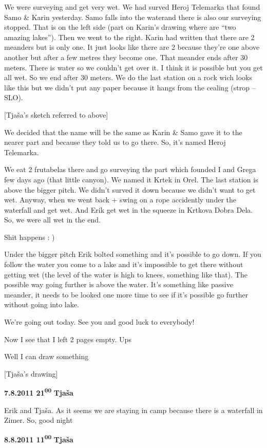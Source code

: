 We were surveying and get very wet. We had surved Heroj Telemarka that
found Samo \& Karin yesterday. Samo falls into the waterand there is
also our surveying stopped. That is on the left side (part on Karin's
drawing where are ``two amazing lakes''). Then we went to the right.
Karin had written that there are 2 meanders but is only one. It just
looks like there are 2 because they're one above another but after a few
metres they become one. That meander ends after 30 meters. There is
water so we couldn't get over it. I think it is possible but you get all
wet. So we end after 30 meters. We do the last station on a rock wich
looks like this but we didn't put any paper because it hangs from the
cealing (strop -- SLO).

{[}Tjaša's sketch referred to above{]}

We decided that the name will be the same as Karin \& Samo gave it to
the nearer part and because they told us to go there. So, it's named
Heroj Telemarka.

We eat 2 frutabelas there and go surveying the part which founded I and
Grega few days ago (that little canyon). We named it Krtek in Orel. The
last station is above the bigger pitch. We didn't surved it down because
we didn't want to get wet. Anyway, when we went back + swing on a rope
accidently under the waterfall and get wet. And Erik get wet in the
squeeze in Krtkova Dobra Dela. So, we were all wet in the end.

Shit happens : )

Under the bigger pitch Erik bolted something and it's possible to go
down. If you follow the water you come to a lake and it's impossible to
get there without getting wet (the level of the water is high to knees,
something like that). The possible way going further is above the water.
It's something like passive meander, it needs to be looked one more time
to see if it's possible go further without going into lake.

We're going out today. See you and good luck to everybody!

Now I see that I left 2 pages empty. Ups

Well I can draw something

{[}Tjaša's drawing{]}

\textbf{7.8.2011 21\textsuperscript{00}} \textbf{Tjaša}

Erik and Tjaša. As it seems we are staying in camp because there is a
waterfall in Zimer. So, good night

\textbf{8.8.2011 11\textsuperscript{00}} \textbf{Tjaša}

